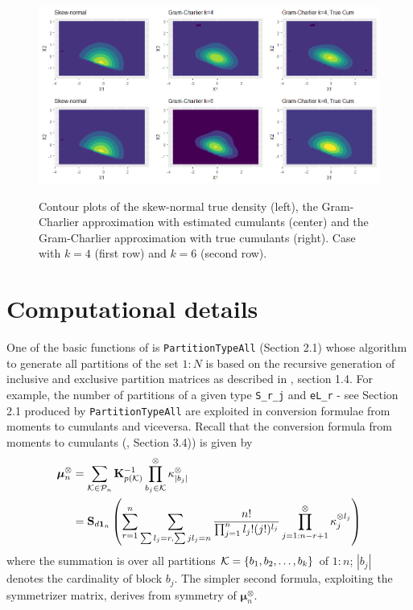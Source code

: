\begin{figure}
\includegraphics[width=1\linewidth,height=0.5\textheight,alt={Contour plots of the skew-normal true density (left), the Gram-Charlier approximation with estimated cumulants (center) and the Gram-Charlier approximation with true cumulants (right). Case with $k=4$ (first row) and $k=6$ (second row).}]{figures/GCALL} \caption{Contour plots of the skew-normal true density (left), the Gram-Charlier approximation with estimated cumulants (center) and the Gram-Charlier approximation with true cumulants (right). Case with $k=4$ (first row) and $k=6$ (second row).}\label{fig:Gram-Charlier}
\end{figure}

\hypertarget{computational-details}{%
\section{Computational details}\label{computational-details}}

One of the basic functions of  is \texttt{PartitionTypeAll} (Section 2.1) whose algorithm to generate all partitions of the set \(1:N\) is based on the recursive generation of inclusive and exclusive partition matrices as described in \citet{terdik2021multivariate}, section 1.4. For example, the number of partitions of a given type \texttt{S\_r\_j} and \texttt{eL\_r} - see Section 2.1 produced by \texttt{PartitionTypeAll} are exploited in conversion formulae from moments to cumulants and viceversa. Recall that the conversion formula from moments to cumulants (\citet{terdik2021multivariate}, Section 3.4)) is given by
\begin{equation}
\begin{split}
\boldsymbol{\mu}_{n}^\otimes &= \sum_{{\cal{K}} \in {\cal{P}}_n} \mathbf{K}^{-1}_{p({\cal{K}})} \prod^\otimes_{b_j \in {\cal{K}}} \kappa^\otimes_{|b_j|}\\
  &= \mathbf{S}_{d \mathbf{1}_n}\left( \sum_{r=1}^n \sum_{\sum l_j =r, \sum j l_j = n} \frac{n!}{\prod_{j=1}^n l_j! (j!)^{l_j}} \prod_{j=1:n-r+1}^\otimes \kappa^{\otimes l_j}_j\right)
\end{split}
\label{eq:mtc}
\end{equation}
where the summation is over all partitions \({\cal{K}} = \{b_1, b_2,\dots, b_k\}\) of \(1 : n\); \(|b_j|\) denotes the cardinality of block \(b_j\). The simpler second formula, exploiting the symmetrizer matrix, derives from symmetry of \(\boldsymbol{\mu}_{n}^\otimes\).

